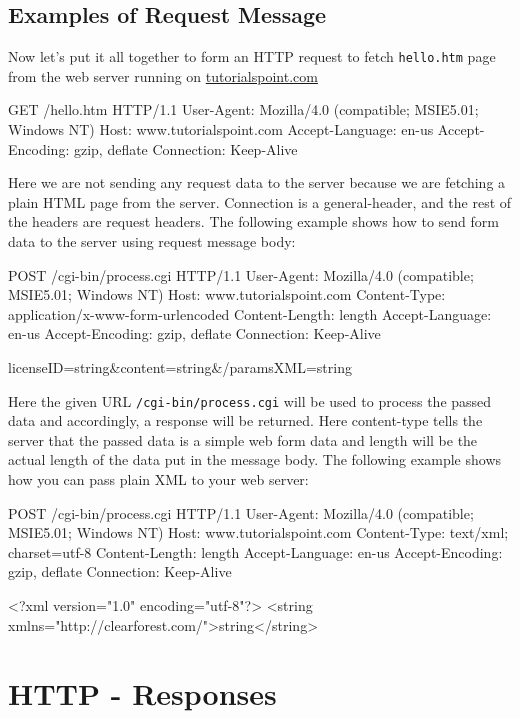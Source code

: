 \documentclass[a4paper,11pt,bahasa]{extarticle}
\begin{document}
\subsection{Examples of Request Message}

Now let's put it all together to form an HTTP request to fetch
\verb|hello.htm| page from the web server running on \url{tutorialspoint.com}
\begin{textcode}
GET /hello.htm HTTP/1.1
User-Agent: Mozilla/4.0 (compatible; MSIE5.01; Windows NT)
Host: www.tutorialspoint.com
Accept-Language: en-us
Accept-Encoding: gzip, deflate
Connection: Keep-Alive
\end{textcode}

Here we are not sending any request data to the server because we are fetching a plain HTML page from 
the server. Connection is a general-header, and the rest of the headers are request headers. The 
following example shows how to send form data to the server using request message body:
\begin{textcode}
POST /cgi-bin/process.cgi HTTP/1.1
User-Agent: Mozilla/4.0 (compatible; MSIE5.01; Windows NT)
Host: www.tutorialspoint.com
Content-Type: application/x-www-form-urlencoded
Content-Length: length
Accept-Language: en-us
Accept-Encoding: gzip, deflate
Connection: Keep-Alive

licenseID=string&content=string&/paramsXML=string
\end{textcode}

Here the given URL \verb|/cgi-bin/process.cgi| will be used to process
the passed data and accordingly, a response will be returned. Here content-type tells the server that 
the passed data is a simple web form data and length will be the actual length of the data put in the 
message body. The following example shows how you can pass plain XML to your web server:

\begin{textcode}
POST /cgi-bin/process.cgi HTTP/1.1
User-Agent: Mozilla/4.0 (compatible; MSIE5.01; Windows NT)
Host: www.tutorialspoint.com
Content-Type: text/xml; charset=utf-8
Content-Length: length
Accept-Language: en-us
Accept-Encoding: gzip, deflate
Connection: Keep-Alive

<?xml version="1.0" encoding="utf-8"?>
<string xmlns="http://clearforest.com/">string</string>
\end{textcode}

\section{HTTP - Responses}
\end{document}

